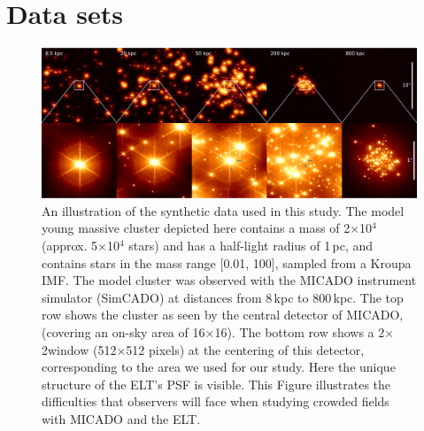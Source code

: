 \section{Data sets}
\label{sec:observations}


\begin{figure}
    \centering
    \includegraphics[width=\textwidth]{images/5_clusters.pdf}
    \caption{An illustration of the synthetic data used in this study. The model young massive cluster depicted here contains a mass of 2$\times$10$^4$\,\msun (approx. 5$\times$10$^4$ stars) and has a half-light radius of 1\,pc, and contains stars in the mass range [0.01, 100]\msune, sampled from a Kroupa IMF. The model cluster was observed with the MICADO instrument simulator (SimCADO) at distances from 8\,kpc to 800\,kpc. The top row shows the cluster as seen by the central detector of MICADO, (covering an on-sky area of 16\arcsec$\times$16\arcsec). The bottom row shows a 2\arcsec$\times$2\arcsec window (512$\times$512 pixels) at the centering of this detector, corresponding to the area we used for our study. Here the unique structure of the ELT's PSF is visible. This Figure illustrates the difficulties that observers will face when studying crowded fields with MICADO and the ELT.
    }
    \label{fig:5_clusters}
\end{figure}


